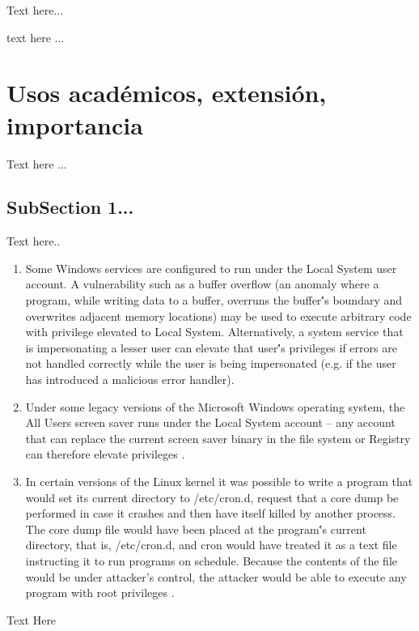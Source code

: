 \documentclass[letterpaper, 10pt, journal]{IEEEtran}
\begin{document}
Text here...

\begin{enumerate}{
    \item Interactive computing (time-sharing)
    \item Hierarchical file systems
    \item Fault tolerant structures
    \item Interrupt systems
    \item Automated overlays (virtual memory)
    \item Multiprogramming
    \item Modular programming
    \item Controlled information sharing
    \item Users
\end{enumerate}

text here ...

\section{Usos acad\'emicos, extensi\'on, importancia}
Text here ...

\subsection{SubSection 1...}
Text here..
\begin{enumerate}
\item	Some Windows services are configured to run under the Local System user account. A vulnerability such as a buffer overflow (an anomaly where a program, while writing data to a buffer, overruns the buffer\''s boundary and overwrites adjacent memory locations) may be used to execute arbitrary code with privilege elevated to Local System. Alternatively, a system service that is impersonating a lesser user can elevate that user\''s privileges if errors are not handled correctly while the user is being impersonated (e.g. if the user has introduced a malicious error handler)\cite{[6]}.
\item	Under some legacy versions of the Microsoft Windows operating system, the All Users screen saver runs under the Local System account – any account that can replace the current screen saver binary in the file system or Registry can therefore elevate privileges \cite{[6]}.
\item	In certain versions of the Linux kernel it was possible to write a program that would set its current directory to /etc/cron.d, request that a core dump be performed in case it crashes and then have itself killed by another process. The core dump file would have been placed at the program\''s current directory, that is, /etc/cron.d, and cron would have treated it as a text file instructing it to run programs on schedule. Because the contents of the file would be under attacker’s control, the attacker would be able to execute any program with root privileges \cite{[3]}.
\end{enumerate}
Text Here
\end{document}
